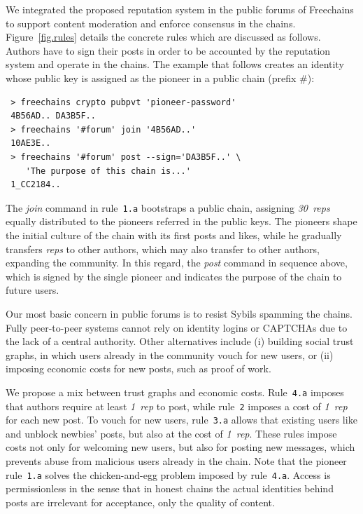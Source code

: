 \documentclass[10pt,journal,compsoc]{IEEEtran}
\newcommand{\FC}       {Freechains\xspace}
\newcommand{\reps}     {\emph{reps}\xspace}
\newcommand{\onerep}   {\emph{1~rep}\xspace}
\newcommand{\nreps}[1] {\emph{#1~reps\xspace}}
\begin{document}
We integrated the proposed reputation system in the public forums of \FC to
support content moderation and enforce consensus in the chains.
Figure~\ref{fig.rules} details the concrete rules which are discussed as
follows.
Authors have to sign their posts in order to be accounted by the reputation
system and operate in the chains.
The example that follows creates an identity whose public key is assigned as
the pioneer in a public chain (prefix $\#$):

{\footnotesize
\begin{verbatim}
 > freechains crypto pubpvt 'pioneer-password'
 4B56AD.. DA3B5F..
 > freechains '#forum' join '4B56AD..'
 10AE3E..
 > freechains '#forum' post --sign='DA3B5F..' \
    'The purpose of this chain is...'
 1_CC2184..
\end{verbatim}
}

The \emph{join} command in rule~\texttt{1.a} bootstraps a public chain,
assigning \nreps{30} equally distributed to the pioneers referred in the public
keys.
The pioneers shape the initial culture of the chain with its first posts and
likes, while he gradually transfers \reps to other authors, which may also
transfer to other authors, expanding the community.
%
In this regard, the \emph{post} command in sequence above, which is signed by
the single pioneer and indicates the purpose of the chain to future users.

Our most basic concern in public forums is to resist Sybils spamming the
chains.
Fully peer-to-peer systems cannot rely on identity logins or CAPTCHAs due
to the lack of a central authority.
Other alternatives include (i) building social trust graphs, in which users
already in the community vouch for new users, or (ii) imposing economic costs
for new posts, such as proof of work.

We propose a mix between trust graphs and economic costs.
Rule~\texttt{4.a} imposes that authors require at least \onerep to post, while
rule~\texttt{2} imposes a cost of \onerep for each new post.
To vouch for new users, rule~\texttt{3.a} allows that existing users like and
unblock newbies' posts, but also at the cost of \onerep.
These rules impose costs not only for welcoming new users, but also for posting
new messages, which prevents abuse from malicious users already in the chain.
%
Note that the pioneer rule~\texttt{1.a} solves the chicken-and-egg problem
imposed by rule~\texttt{4.a}.
%
Access is permissionless in the sense that in honest chains the actual
identities behind posts are irrelevant for acceptance, only the quality of
content.
\end{document}
